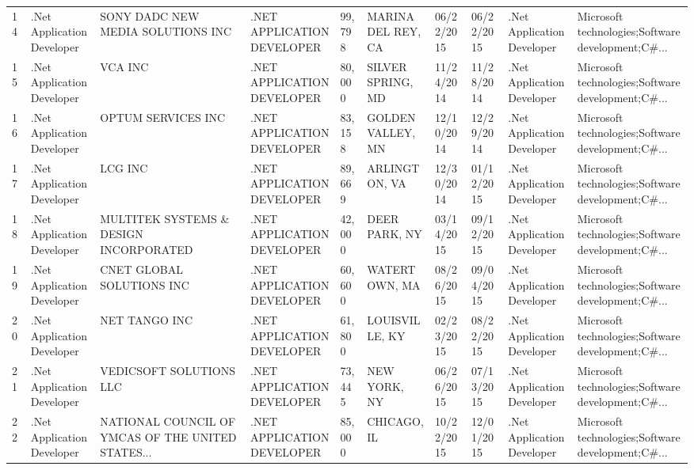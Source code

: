 \begin{table}[h!]
{\begin{tabular}{llllllllll}
	14 &  .Net Application Developer &                  SONY DADC NEW MEDIA SOLUTIONS INC &  .NET APPLICATION DEVELOPER &      99,798 &  MARINA DEL REY, CA &  06/22/2015 &  06/22/2015 &  .Net Application Developer &  Microsoft technologies;Software development;C\#... \\
	15 &  .Net Application Developer &                                            VCA INC &  .NET APPLICATION DEVELOPER &      80,000 &   SILVER SPRING, MD &  11/24/2014 &  11/28/2014 &  .Net Application Developer &  Microsoft technologies;Software development;C\#... \\
	16 &  .Net Application Developer &                                 OPTUM SERVICES INC &  .NET APPLICATION DEVELOPER &      83,158 &   GOLDEN VALLEY, MN &  12/10/2014 &  12/29/2014 &  .Net Application Developer &  Microsoft technologies;Software development;C\#... \\
	17 &  .Net Application Developer &                                            LCG INC &  .NET APPLICATION DEVELOPER &      89,669 &       ARLINGTON, VA &  12/30/2014 &  01/12/2015 &  .Net Application Developer &  Microsoft technologies;Software development;C\#... \\
	18 &  .Net Application Developer &             MULTITEK SYSTEMS \& DESIGN INCORPORATED &  .NET APPLICATION DEVELOPER &      42,000 &       DEER PARK, NY &  03/14/2015 &  09/12/2015 &  .Net Application Developer &  Microsoft technologies;Software development;C\#... \\
	19 &  .Net Application Developer &                          CNET GLOBAL SOLUTIONS INC &  .NET APPLICATION DEVELOPER &      60,600 &       WATERTOWN, MA &  08/26/2015 &  09/04/2015 &  .Net Application Developer &  Microsoft technologies;Software development;C\#... \\
	20 &  .Net Application Developer &                                      NET TANGO INC &  .NET APPLICATION DEVELOPER &      61,800 &      LOUISVILLE, KY &  02/23/2015 &  08/22/2015 &  .Net Application Developer &  Microsoft technologies;Software development;C\#... \\
	21 &  .Net Application Developer &                            VEDICSOFT SOLUTIONS LLC &  .NET APPLICATION DEVELOPER &      73,445 &        NEW YORK, NY &  06/26/2015 &  07/13/2015 &  .Net Application Developer &  Microsoft technologies;Software development;C\#... \\
	22 &  .Net Application Developer &  NATIONAL COUNCIL OF YMCAS OF THE UNITED STATES... &  .NET APPLICATION DEVELOPER &      85,000 &         CHICAGO, IL &  10/22/2015 &  12/01/2015 &  .Net Application Developer &  Microsoft technologies;Software development;C\#... \\

\end{tabular}}
\end{table}
